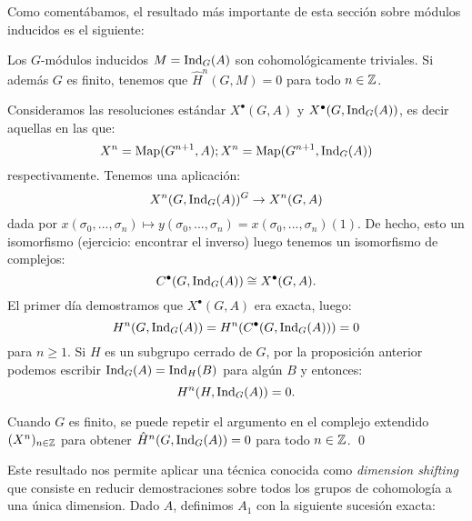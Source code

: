 \documentclass[a4paper,12pt, leqno]{article}
\begin{document}
Como comentábamos, el resultado más importante de esta sección sobre módulos inducidos es el siguiente:
\begin{prop}
	Los $G$-módulos inducidos $M=\mathrm{Ind}_G (A)$ son cohomológicamente triviales. Si además $G$ es finito, tenemos que $\hat{H}^n(G,M)=0$ para todo $n \in \mathbb{Z}$.
\end{prop}
\begin{dem}
	Consideramos las resoluciones estándar $X^{\bullet}(G,A)$ y $X^{\bullet}(G,\mathrm{Ind}_G (A))$, es decir aquellas en las que:
	\begin{equation*}
	X^n=\mathrm{Map}(G^{n+1},A);X^n=\mathrm{Map}(G^{n+1},\mathrm{Ind}_G (A))
	\end{equation*}
	 respectivamente. Tenemos una aplicación:
	 \begin{equation*}
	 X^n(G,\mathrm{Ind}_G (A))^G \rightarrow X^n(G,A)
	 \end{equation*}
	 dada por $x(\sigma_0,...,\sigma_n)\mapsto y(\sigma_0,...,\sigma_n)=x(\sigma_0,...,\sigma_n)(1)$. De hecho, esto un isomorfismo (ejercicio: encontrar el inverso) luego tenemos un isomorfismo de complejos:
	 \begin{equation*}
	 C^{\bullet}(G,\mathrm{Ind}_G (A))\cong X^{\bullet}(G,A).
	 \end{equation*}
	 El primer día demostramos que $X^{\bullet}(G,A)$ era exacta, luego:
	 \begin{equation*}
	 H^n(G,\mathrm{Ind}_G (A))=H^n(C^{\bullet}(G,\mathrm{Ind}_G (A)))=0
	 \end{equation*}
	 para $n\geq 1$. Si $H$ es  un subgrupo cerrado de $G$, por la proposición anterior podemos escribir $\mathrm{Ind}_G (A)=\mathrm{Ind}_H(B)$ para algún $B$ y entonces: 
	 \begin{equation*}
	 H^n(H,\mathrm{Ind}_G (A))=0.
	 \end{equation*}
	 
	 Cuando $G$ es finito, se puede repetir el argumento en el complejo extendido $(X^n)_{n \in \mathbb{Z}}$ para obtener $\hat{H}^n(G, \mathrm{Ind}_G (A))=0$ para todo $n \in \mathbb{Z}$. \qed
\end{dem}
Este resultado nos permite aplicar una técnica conocida como \textit{dimension shifting} que consiste en reducir demostraciones sobre todos los grupos de cohomología a una única dimension. Dado $A$, definimos $A_1$ con la siguiente sucesión exacta:
\begin{center}
\end{center}
\end{document}
